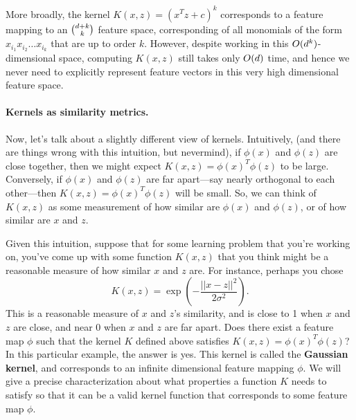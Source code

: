 \documentclass{article}
\begin{document}
More broadly, the kernel $K(x,z) = (x^Tz + c)^k$ corresponds to a feature mapping
to an $\binom{{d}+k}{k}$ feature space, corresponding
of all monomials of the form $x_{i_1} x_{i_2} \ldots x_{i_k}$ that are up to order $k$.  However, despite
working in this $O({d}^k)$-dimensional space, computing $K(x,z)$ still takes only $O({d})$ time,
and hence we never need to explicitly represent feature vectors in this very high dimensional
feature space.



\paragraph{Kernels as similarity metrics.}Now, let's talk about a slightly different view of kernels.  Intuitively,
(and there are things wrong with this intuition, but nevermind),
if $\phi(x)$
and $\phi(z)$ are close together, then we might expect $K(x,z) = \phi(x)^T\phi(z)$ to be
large.  Conversely, if $\phi(x)$ and $\phi(z)$ are far apart---say nearly orthogonal to
each other---then $K(x,z) = \phi(x)^T \phi(z)$ will be small.  So, we can think
of $K(x,z)$ as some measurement of how similar are $\phi(x)$ and $\phi(z)$, or of how
similar are $x$ and $z$.

Given this intuition, suppose that for some learning problem that you're working on, you've
come up with some function $K(x,z)$ that you think might be a reasonable measure of how similar
$x$ and $z$ are.  For instance, perhaps you chose
\[
K(x,z) = \exp\left(- \frac{||x-z||^2}{2\sigma^2}\right).
\]
This is a reasonable measure of $x$ and $z$'s similarity, and is close to 1 when $x$ and $z$ are
close, and near 0 when $x$ and $z$ are far apart. Does there exist a feature map $\phi$ such that the kernel $K$ defined above satisfies 
$K(x,z) = \phi(x)^T\phi(z)$?
 In this particular example, the answer is yes.
This kernel is called the {\bf Gaussian kernel}, and corresponds to an infinite dimensional
feature mapping $\phi$.  We will give a precise characterization about what properties a function $K$ needs to satisfy so that it can be a valid kernel function that corresponds to some feature map $\phi$.
\end{document}
